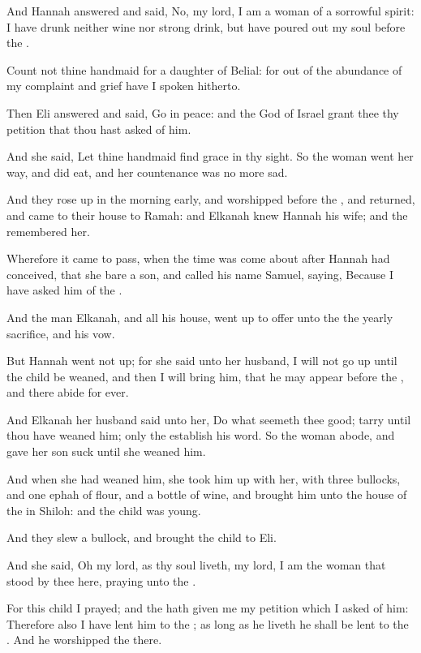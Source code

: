 \verse And Hannah answered and said, No, my lord, I am a woman of a sorrowful spirit: I have drunk neither wine nor strong drink, but have poured out my soul before the \LORD.

\verse Count not thine handmaid for a daughter of Belial: for out of the abundance of my complaint and grief have I spoken hitherto.

\verse Then Eli answered and said, Go in peace: and the God of Israel grant thee thy petition that thou hast asked of him.

\verse And she said, Let thine handmaid find grace in thy sight. So the woman went her way, and did eat, and her countenance was no more sad.

\verse And they rose up in the morning early, and worshipped before the \LORD, and returned, and came to their house to Ramah: and Elkanah knew Hannah his wife; and the \LORD remembered her.

\verse Wherefore it came to pass, when the time was come about after Hannah had conceived, that she bare a son, and called his name Samuel, saying, Because I have asked him of the \LORD.

\verse And the man Elkanah, and all his house, went up to offer unto the \LORD the yearly sacrifice, and his vow.

\verse But Hannah went not up; for she said unto her husband, I will not go up until the child be weaned, and then I will bring him, that he may appear before the \LORD, and there abide for ever.

\verse And Elkanah her husband said unto her, Do what seemeth thee good; tarry until thou have weaned him; only the \LORD establish his word. So the woman abode, and gave her son suck until she weaned him.

\verse And when she had weaned him, she took him up with her, with three bullocks, and one ephah of flour, and a bottle of wine, and brought him unto the house of the \LORD in Shiloh: and the child was young.

\verse And they slew a bullock, and brought the child to Eli.

\verse And she said, Oh my lord, as thy soul liveth, my lord, I am the woman that stood by thee here, praying unto the \LORD.

\verse For this child I prayed; and the \LORD hath given me my petition which I asked of him: \verse Therefore also I have lent him to the \LORD; as long as he liveth he shall be lent to the \LORD. And he worshipped the \LORD there.



